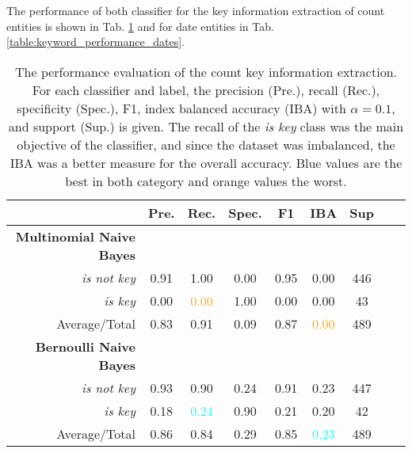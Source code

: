   The performance of both classifier for the key information extraction of count entities is shown in Tab. \ref{table:keyword_performance_counts} and for date entities in Tab. \ref{table:keyword_performance_dates}.
  \begin{table}[h!]
    \caption{The performance evaluation of the count key information extraction. For each classifier and label, the precision (Pre.), recall (Rec.), specificity (Spec.), F1, index balanced accuracy (IBA) with $\alpha = 0.1$, and support (Sup.) is given. The recall of the \textsl{is key} class was the main objective of the classifier, and since the dataset was imbalanced, the IBA was a better measure for the overall accuracy. Blue values are the best in both category and orange values the worst.}
    \centering
    \begin{tabular}{@{}rcccccccc@{}}
      \toprule
       & \textbf{Pre.} & \textbf{Rec.} & \textbf{Spec.}
      & \textbf{F1} &  \textbf{IBA}& \textbf{Sup} \\
      \midrule
      \textbf{Multinomial Naive Bayes}\\
      \textsl{is not key}& 0.91& 1.00&  0.00& 0.95& 0.00& 446 \\
      \textsl{is key}& 0.00& \textcolor{orange}{0.00}&  1.00& 0.00& 0.00& 43 \\
      Average/Total& 0.83& 0.91& 0.09& 0.87& \textcolor{orange}{0.00}& 489 \vspace{2mm}\\
      \textbf{Bernoulli Naive Bayes}\\
      \textsl{is not key}& 0.93& 0.90&  0.24& 0.91& 0.23& 447 \\
      \textsl{is key}& 0.18& \textcolor{cyan}{0.24}&  0.90& 0.21& 0.20& 42 \\
      Average/Total& 0.86& 0.84& 0.29& 0.85& \textcolor{cyan}{0.23}& 489 \vspace{2mm}\\
      \bottomrule
    \end{tabular}
  \label{table:keyword_performance_counts}
  \end{table}

